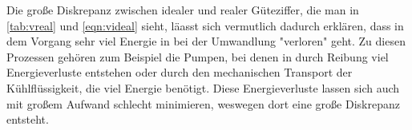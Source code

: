 Die große Diskrepanz zwischen idealer und realer Güteziffer, die man in \ref{tab:vreal} und \ref{eqn:videal} sieht,
läasst sich vermutlich dadurch erklären, dass in dem Vorgang sehr viel Energie in bei der Umwandlung
"verloren" geht.
Zu diesen Prozessen gehören zum Beispiel die Pumpen, bei denen in durch Reibung viel Energieverluste entstehen
oder durch den mechanischen Transport der Kühlflüssigkeit, die viel Energie benötigt.
Diese Energieverluste lassen sich auch mit großem Aufwand schlecht minimieren, weswegen dort eine große Diskrepanz entsteht.



